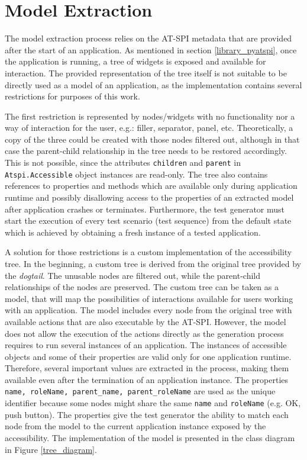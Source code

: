 \section{Model Extraction}
The model extraction process relies on the AT-SPI metadata that are provided after the start of an application. As mentioned in section \ref{library_pyatspi}, once the application is running, a tree of widgets is exposed and available for interaction. The provided representation of the tree itself is not suitable to be directly used as a model of an application, as the implementation contains several restrictions for purposes of this work.

The first restriction is represented by nodes/widgets with no functionality nor a way of interaction for the user, e.g.: filler, separator, panel, etc. Theoretically, a copy of the three could be created with those nodes filtered out, although in that case the parent-child relationship in the tree needs to be restored accordingly. This is not possible, since the attributes \texttt{children} and \texttt{parent} in \texttt{Atspi.Accessible} object instances are read-only. The tree also contains references to properties and methods which are available only during application runtime and possibly disallowing access to the properties of an extracted model after application crashes or terminates. Furthermore, the test generator must start the execution of every test scenario (test sequence) from the default state which is achieved by obtaining a fresh instance of a tested application.

A solution for those restrictions is a custom implementation of the accessibility tree. In the beginning, a custom tree is derived from the original tree provided by the \textit{dogtail}. The unusable nodes are filtered out, while the parent-child relationships of the nodes are preserved. The custom tree can be taken as a model, that will map the possibilities of interactions available for users working with an application. The model includes every node from the original tree with available actions that are also executable by the AT-SPI. However, the model does not allow the execution of the actions directly as the generation process requires to run several instances of an application. The instances of accessible objects and some of their properties are valid only for one application runtime. Therefore, several important values are extracted in the process, making them available even after the termination of an application instance. The properties \texttt{name, roleName, parent\_name, parent\_roleName} are used as the unique identifier because some nodes might share the same \texttt{name} and \texttt{roleName} (e.g. OK, push button). The properties give the test generator the ability to match each node from the model to the current application instance exposed by the accessibility. The implementation of the model is presented in the class diagram in Figure \ref{tree_diagram}.

